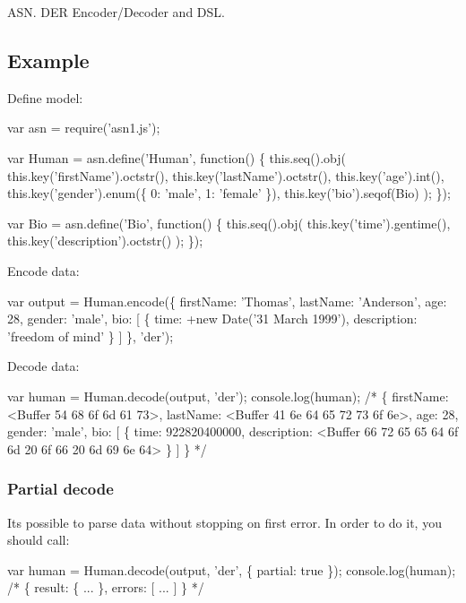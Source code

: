 A\+S\+N. D\+ER Encoder/\+Decoder and D\+SL.

\subsection*{Example}

Define model\+:


\begin{DoxyCode}
var asn = require('asn1.js');

var Human = asn.define('Human', function() \{
  this.seq().obj(
    this.key('firstName').octstr(),
    this.key('lastName').octstr(),
    this.key('age').int(),
    this.key('gender').enum(\{ 0: 'male', 1: 'female' \}),
    this.key('bio').seqof(Bio)
  );
\});

var Bio = asn.define('Bio', function() \{
  this.seq().obj(
    this.key('time').gentime(),
    this.key('description').octstr()
  );
\});
\end{DoxyCode}


Encode data\+:


\begin{DoxyCode}
var output = Human.encode(\{
  firstName: 'Thomas',
  lastName: 'Anderson',
  age: 28,
  gender: 'male',
  bio: [
    \{
      time: +new Date('31 March 1999'),
      description: 'freedom of mind'
    \}
  ]
\}, 'der');
\end{DoxyCode}


Decode data\+:


\begin{DoxyCode}
var human = Human.decode(output, 'der');
console.log(human);
/*
\{ firstName: <Buffer 54 68 6f 6d 61 73>,
  lastName: <Buffer 41 6e 64 65 72 73 6f 6e>,
  age: 28,
  gender: 'male',
  bio:
   [ \{ time: 922820400000,
       description: <Buffer 66 72 65 65 64 6f 6d 20 6f 66 20 6d 69 6e 64> \} ] \}
*/
\end{DoxyCode}


\subsubsection*{Partial decode}

Its possible to parse data without stopping on first error. In order to do it, you should call\+:


\begin{DoxyCode}
var human = Human.decode(output, 'der', \{ partial: true \});
console.log(human);
/*
\{ result: \{ ... \},
  errors: [ ... ] \}
*/
\end{DoxyCode}


